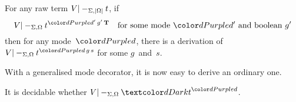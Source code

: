 \begin{lemma}\label{thm:adjustment}
For any raw term $V |-_{\Sigma,\left|\Omega\right|} t$, if
\begin{equation}\label{eq:strict-derivation}
V |-_{\Sigma,\Omega} t^{\dir{d'}\,g'\,\BTrue} \quad\text{for some mode~$\dir{d'}$ and boolean~$g'$}
\end{equation}
then for any mode~$\dir{d}$, there is a derivation of\/ $V |-_{\Sigma,\Omega} t^{\dir{d}\,g\,s}$ for some $g$~and~$s$.
\end{lemma}


%

With a generalised mode decorator, it is now easy to derive an ordinary one.

\begin{corollary}\label{thm:mode-decoration}
  It is decidable whether $V |-_{\Sigma,\Omega} \isTerm{t}^\dir{d}$.%
\end{corollary}


